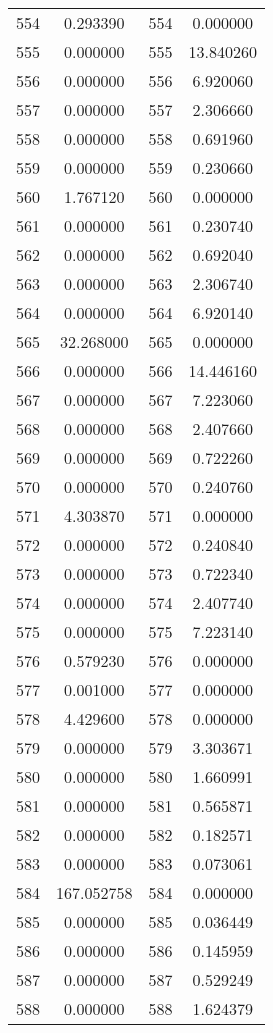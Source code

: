 \documentclass[12pt]{article}
\begin{document}
\begin{longtable}{@{}cccc@{}}
554 & 0.293390 & 554 & 0.000000 \\
555 & 0.000000 & 555 & 13.840260 \\
556 & 0.000000 & 556 & 6.920060 \\
557 & 0.000000 & 557 & 2.306660 \\
558 & 0.000000 & 558 & 0.691960 \\
559 & 0.000000 & 559 & 0.230660 \\
560 & 1.767120 & 560 & 0.000000 \\
561 & 0.000000 & 561 & 0.230740 \\
562 & 0.000000 & 562 & 0.692040 \\
563 & 0.000000 & 563 & 2.306740 \\
564 & 0.000000 & 564 & 6.920140 \\
565 & 32.268000 & 565 & 0.000000 \\
566 & 0.000000 & 566 & 14.446160 \\
567 & 0.000000 & 567 & 7.223060 \\
568 & 0.000000 & 568 & 2.407660 \\
569 & 0.000000 & 569 & 0.722260 \\
570 & 0.000000 & 570 & 0.240760 \\
571 & 4.303870 & 571 & 0.000000 \\
572 & 0.000000 & 572 & 0.240840 \\
573 & 0.000000 & 573 & 0.722340 \\
574 & 0.000000 & 574 & 2.407740 \\
575 & 0.000000 & 575 & 7.223140 \\
576 & 0.579230 & 576 & 0.000000 \\
577 & 0.001000 & 577 & 0.000000 \\
578 & 4.429600 & 578 & 0.000000 \\
579 & 0.000000 & 579 & 3.303671 \\
580 & 0.000000 & 580 & 1.660991 \\
581 & 0.000000 & 581 & 0.565871 \\
582 & 0.000000 & 582 & 0.182571 \\
583 & 0.000000 & 583 & 0.073061 \\
584 & 167.052758 & 584 & 0.000000 \\
585 & 0.000000 & 585 & 0.036449 \\
586 & 0.000000 & 586 & 0.145959 \\
587 & 0.000000 & 587 & 0.529249 \\
588 & 0.000000 & 588 & 1.624379 \\

\end{longtable}
\end{document}
